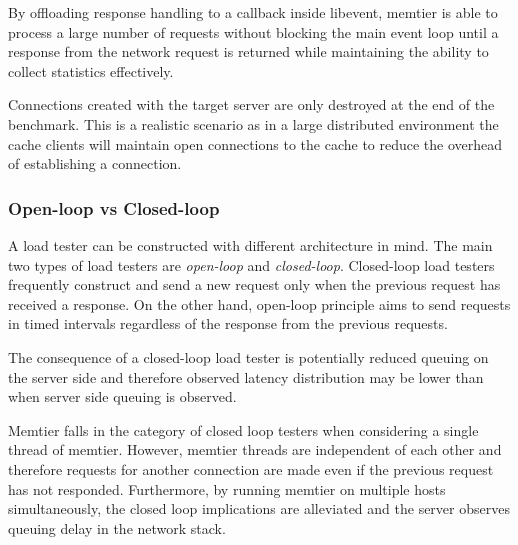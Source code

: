 By offloading response handling to a callback inside libevent, memtier is able to process a large number of requests without blocking the main event loop until a response from the network request is returned while maintaining the ability to collect statistics effectively.

Connections created with the target server are only destroyed at the end of the benchmark. This is a realistic scenario as in a large distributed environment the cache clients will maintain open connections to the cache to reduce the overhead of establishing a connection.


\subsubsection{Open-loop vs Closed-loop}
A load tester can be constructed with different architecture in mind. The main two types of load testers are \textit{open-loop} and \textit{closed-loop}. Closed-loop load testers frequently construct and send a new request only when the previous request has received a response. On the other hand, open-loop principle aims to send requests in timed intervals regardless of the response from the previous requests.

The consequence of a closed-loop load tester is potentially reduced queuing on the server side and therefore observed latency distribution may be lower than when server side queuing is observed.

Memtier falls in the category of closed loop testers when considering a single thread of memtier. However, memtier threads are independent of each other and therefore requests for another connection are made even if the previous request has not responded. Furthermore, by running memtier on multiple hosts simultaneously, the closed loop implications are alleviated and the server observes queuing delay in the network stack.
